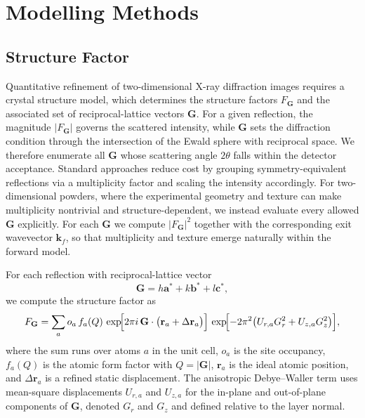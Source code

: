 \section{Modelling Methods}

\subsection{Structure Factor}

Quantitative refinement of two-dimensional X-ray diffraction images requires a crystal structure model, which determines the structure factors $F_{\mathbf{G}}$ and the associated set of reciprocal-lattice vectors $\mathbf{G}$. For a given reflection, the magnitude $\lvert F_{\mathbf{G}}\rvert$ governs the scattered intensity, while $\mathbf{G}$ sets the diffraction condition through the intersection of the Ewald sphere with reciprocal space. We therefore enumerate all $\mathbf{G}$ whose scattering angle $2\theta$ falls within the detector acceptance. Standard approaches reduce cost by grouping symmetry-equivalent reflections via a multiplicity factor and scaling the intensity accordingly. For two-dimensional powders, where the experimental geometry and texture can make multiplicity nontrivial and structure-dependent, we instead evaluate every allowed $\mathbf{G}$ explicitly. For each $\mathbf{G}$ we compute $\lvert F_{\mathbf{G}}\rvert^{2}$ together with the corresponding exit wavevector $\mathbf{k}_f$, so that multiplicity and texture emerge naturally within the forward model.

For each reflection with reciprocal-lattice vector
\[
\mathbf{G}=h\mathbf{a}^{*}+k\mathbf{b}^{*}+l\mathbf{c}^{*},
\]
we compute the structure factor as
\begin{equation}
  F_{\mathbf{G}}
  =
  \sum_{a} o_{a}\,f_{a}(Q)\,
  \exp\!\Bigl[ 2\pi i\,\mathbf{G}\cdot\bigl(\mathbf{r}_{a}+\Delta\mathbf{r}_{a}\bigr) \Bigr]\,
  \exp\!\Bigl[ -2\pi^{2}\bigl(U_{r,a} G_{r}^{2}+U_{z,a} G_{z}^{2}\bigr) \Bigr],
  \label{eq:structure_factor}
\end{equation}
where the sum runs over atoms $a$ in the unit cell, $o_a$ is the site occupancy,
$f_a(Q)$ is the atomic form factor with $Q=\lvert\mathbf{G}\rvert$,
$\mathbf{r}_a$ is the ideal atomic position, and $\Delta\mathbf{r}_a$ is a refined static displacement.
The anisotropic Debye--Waller term uses mean-square displacements $U_{r,a}$ and $U_{z,a}$ for the in-plane and out-of-plane components of $\mathbf{G}$, denoted $G_r$ and $G_z$ and defined relative to the layer normal.


